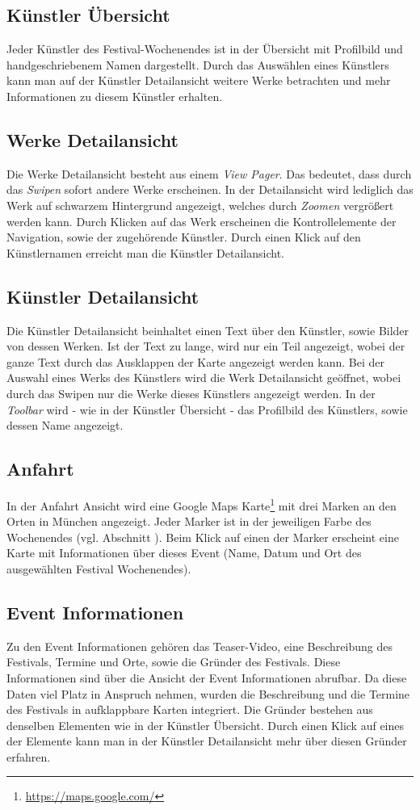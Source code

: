 \subsection{Künstler Übersicht}
Jeder Künstler des Festival-Wochenendes ist in der Übersicht mit Profilbild und handgeschriebenem Namen dargestellt. Durch das Auswählen eines Künstlers kann man auf der Künstler Detailansicht weitere Werke betrachten und mehr Informationen zu diesem Künstler erhalten.

\subsection{Werke Detailansicht}
Die Werke Detailansicht besteht aus einem \textit{View Pager}. Das bedeutet, dass durch das \textit{Swipen} sofort andere Werke erscheinen. In der Detailansicht wird lediglich das Werk auf schwarzem Hintergrund angezeigt, welches durch \textit{Zoomen} vergrößert werden kann. Durch Klicken auf das Werk erscheinen die Kontrollelemente der Navigation, sowie der zugehörende Künstler. Durch einen Klick auf den Künstlernamen erreicht man die Künstler Detailansicht.

\subsection{Künstler Detailansicht}
Die Künstler Detailansicht beinhaltet einen Text über den Künstler, sowie Bilder von dessen Werken. Ist der Text zu lange, wird nur ein Teil angezeigt, wobei der ganze Text durch das Ausklappen der Karte angezeigt werden kann. Bei der Auswahl eines Werks des Künstlers wird die Werk Detailansicht geöffnet, wobei durch das Swipen nur die Werke dieses Künstlers angezeigt werden. In der \textit{Toolbar} wird - wie in der Künstler Übersicht - das Profilbild des Künstlers, sowie dessen Name angezeigt. 

\subsection{Anfahrt}
In der Anfahrt Ansicht wird eine Google Maps Karte\footnote{\url{https://maps.google.com/}} mit drei Marken an den Orten in München angezeigt. Jeder Marker ist in der jeweiligen Farbe des Wochenendes (vgl. Abschnitt ). Beim Klick auf einen der Marker erscheint eine Karte mit Informationen über dieses Event (Name, Datum und Ort des ausgewählten Festival Wochenendes). 

\subsection{Event Informationen}
Zu den Event Informationen gehören das Teaser-Video, eine Beschreibung des Festivals, Termine und Orte, sowie die Gründer des Festivals. Diese Informationen sind über die Ansicht der Event Informationen abrufbar. Da diese Daten viel Platz in Anspruch nehmen, wurden die Beschreibung und die Termine des Festivals in aufklappbare Karten integriert. Die Gründer bestehen aus denselben Elementen wie in der Künstler Übersicht. Durch einen Klick auf eines der Elemente kann man in der Künstler Detailansicht mehr über diesen Gründer erfahren.

